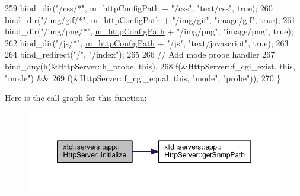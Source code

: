 \begin{DoxyCode}
259   bind\_dir(\textcolor{stringliteral}{"/css/*"},        \hyperlink{classxtd_1_1servers_1_1app_1_1HttpServer_abfb9586e84fa5149da3226eeea39980f}{m\_httpConfigPath} + \textcolor{stringliteral}{"/css"},        \textcolor{stringliteral}{"text/css"},        \textcolor{keyword}{true});
260   bind\_dir(\textcolor{stringliteral}{"/img/gif/*"},    \hyperlink{classxtd_1_1servers_1_1app_1_1HttpServer_abfb9586e84fa5149da3226eeea39980f}{m\_httpConfigPath} + \textcolor{stringliteral}{"/img/gif"},    \textcolor{stringliteral}{"image/gif"},       \textcolor{keyword}{true});
261   bind\_dir(\textcolor{stringliteral}{"/img/png/*"},    \hyperlink{classxtd_1_1servers_1_1app_1_1HttpServer_abfb9586e84fa5149da3226eeea39980f}{m\_httpConfigPath} + \textcolor{stringliteral}{"/img/png"},    \textcolor{stringliteral}{"image/png"},       \textcolor{keyword}{true});
262   bind\_dir(\textcolor{stringliteral}{"/js/*"},         \hyperlink{classxtd_1_1servers_1_1app_1_1HttpServer_abfb9586e84fa5149da3226eeea39980f}{m\_httpConfigPath} + \textcolor{stringliteral}{"/js"},         \textcolor{stringliteral}{"text/javascript"}, \textcolor{keyword}{true});
263 
264   bind\_redirect(\textcolor{stringliteral}{"/"}, \textcolor{stringliteral}{"/index"});
265 
266   \textcolor{comment}{// Add mode probe handler}
267   bind\_any(h(&HttpServer::h\_probe, \textcolor{keyword}{this}),
268            f(&HttpServer::f\_cgi\_exist, \textcolor{keyword}{this}, \textcolor{stringliteral}{"mode"}) &&
269            f(&HttpServer::f\_cgi\_equal, \textcolor{keyword}{this}, \textcolor{stringliteral}{"mode"}, \textcolor{stringliteral}{"probe"}));
270 \}
\end{DoxyCode}


Here is the call graph for this function\-:
\nopagebreak
\begin{figure}[H]
\begin{center}
\leavevmode
\includegraphics[width=350pt]{classxtd_1_1servers_1_1app_1_1HttpServer_a0924e53b6bc9de7563c33690d619ce9d_cgraph}
\end{center}
\end{figure}


